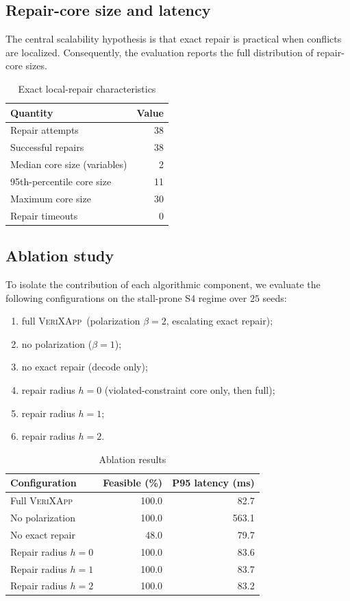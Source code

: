 \documentclass[pdflatex,sn-mathphys-num,iicol,oneside]{sn-jnl}
\newcommand{\method}{\textsc{VeriXApp}}
\begin{document}
\subsection{Repair-core size and latency}

The central scalability hypothesis is that exact repair is practical
when conflicts are localized. Consequently, the evaluation reports the
full distribution of repair-core sizes.

\begin{table}[t]
\centering
\caption{Exact local-repair characteristics}
\label{tab:repair}
\begin{tabular}{lr}
\toprule
Quantity & Value\\
\midrule
Repair attempts & 38\\
Successful repairs & 38\\
Median core size (variables) & 2\\
95th-percentile core size & 11\\
Maximum core size & 30\\
Repair timeouts & 0\\
\bottomrule
\end{tabular}
\end{table}

\subsection{Ablation study}

To isolate the contribution of each algorithmic component, we
evaluate the following configurations on the stall-prone S4 regime
over $25$ seeds:

\begin{enumerate}
    \item full \method\ (polarization $\beta=2$, escalating exact
    repair);
    \item no polarization ($\beta=1$);
    \item no exact repair (decode only);
    \item repair radius $h=0$ (violated-constraint core only, then
    full);
    \item repair radius $h=1$;
    \item repair radius $h=2$.
\end{enumerate}

\begin{table}[t]
\centering
\caption{Ablation results}
\label{tab:ablation}
\begin{tabular}{lrr}
\toprule
Configuration &
Feasible (\%) &
P95 latency (ms)\\
\midrule
Full \method &
100.0 & 82.7\\
No polarization &
100.0 & 563.1\\
No exact repair &
48.0 & 79.7\\
Repair radius $h=0$ &
100.0 & 83.6\\
Repair radius $h=1$ &
100.0 & 83.7\\
Repair radius $h=2$ &
100.0 & 83.2\\
\bottomrule
\end{tabular}
\end{table}
\end{document}
